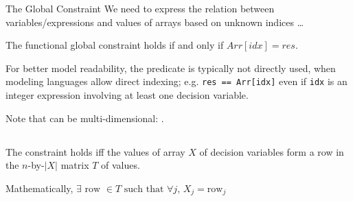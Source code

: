 \documentclass{cons-beamer}
\begin{document}
\begin{frame}{The  Global Constraint}
	We need to express the relation between variables/expressions and values of arrays based on unknown indices \dots
	
	\begin{definition}
		The  functional global constraint holds if and only if $Arr[idx] = res$.
	\end{definition}\vfill
	
	\alert{For better model readability}, the  predicate is typically not directly used,
	when modeling languages allow direct indexing; e.g. \texttt{res == Arr[idx]}
	even if \texttt{idx} is an integer expression involving at least one decision variable.
	\vfill
	
	Note that  can be multi-dimensional: .
\end{frame}


\subsection{}

\begin{frame}{}
	\begin{definition}
		The  constraint holds iff the values of array $X$ of decision variables form a row in the $n$-by-$|X|$ matrix $T$ of values.
		\parBreak
		
		Mathematically, $\exists \text{ row } \in T \text{ such that } \forall j, \, X_j = \text{row}_j$ %
	\end{definition}
\end{frame}
\end{document}
